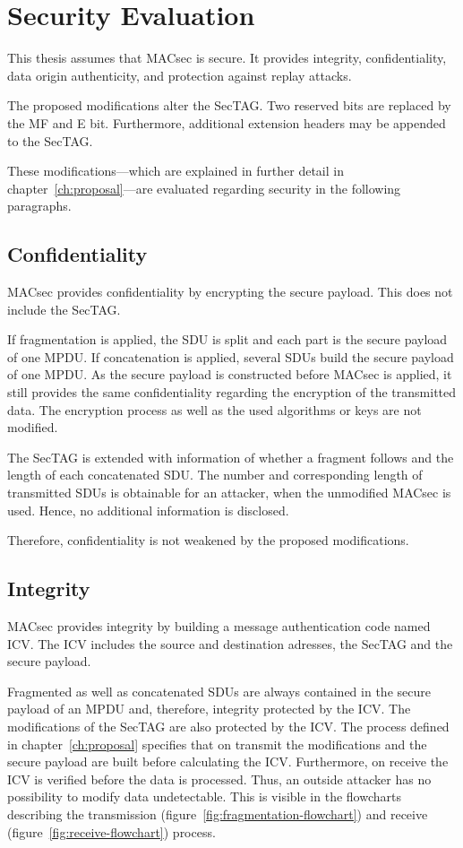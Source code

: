 \section{Security Evaluation}
This thesis assumes that \gls{MACsec} is secure.
It provides integrity, confidentiality, data origin authenticity, and protection against replay attacks.

The proposed modifications alter the \gls{SecTAG}.
Two reserved bits are replaced by the \acrlong{MF} and \acrlong{E} bit.
Furthermore, additional extension headers may be appended to the \gls{SecTAG}.

These modifications---which are explained in further detail in chapter~\ref{ch:proposal}---are evaluated regarding security in the following paragraphs.

\subsection{Confidentiality}
\gls{MACsec} provides confidentiality by encrypting the secure payload.
This does not include the \gls{SecTAG}.

If fragmentation is applied, the \gls{SDU} is split and each part is the secure payload of one \gls{MPDU}.
If concatenation is applied, several \glspl{SDU} build the secure payload of one \gls{MPDU}.
As the secure payload is constructed before \gls{MACsec} is applied, it still provides the same confidentiality regarding the encryption of the transmitted data.
The encryption process as well as the used algorithms or keys are not modified.

The \gls{SecTAG} is extended with information of whether a fragment follows and the length of each concatenated \gls{SDU}.
The number and corresponding length of transmitted \glspl{SDU} is obtainable for an attacker, when the unmodified \gls{MACsec} is used.
Hence, no additional information is disclosed.

Therefore, confidentiality is not weakened by the proposed modifications.

\subsection{Integrity}
\gls{MACsec} provides integrity by building a message authentication code named \gls{ICV}.
The \gls{ICV} includes the source and destination adresses, the \gls{SecTAG} and the secure payload.

Fragmented as well as concatenated \glspl{SDU} are always contained in the secure payload of an \gls{MPDU} and, therefore, integrity protected by the \gls{ICV}.
The modifications of the \gls{SecTAG} are also protected by the \gls{ICV}.
The process defined in chapter~\ref{ch:proposal} specifies that on transmit the modifications and the secure payload are built before calculating the \gls{ICV}.
Furthermore, on receive the \gls{ICV} is verified before the data is processed.
Thus, an outside attacker has no possibility to modify data undetectable.
This is visible in the flowcharts describing the transmission (figure~\ref{fig:fragmentation-flowchart}) and receive (figure~\ref{fig:receive-flowchart}) process.

